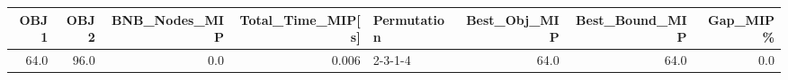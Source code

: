 \begin{tabular}{rrrrlrrr}
\toprule
 OBJ1 &  OBJ2 &  BNB\_Nodes\_MIP &  Total\_Time\_MIP[s] & Permutation &  Best\_Obj\_MIP &  Best\_Bound\_MIP &  Gap\_MIP\% \\
\midrule
 64.0 &  96.0 &            0.0 &              0.006 &     2-3-1-4 &          64.0 &            64.0 &       0.0 \\
\bottomrule
\end{tabular}
